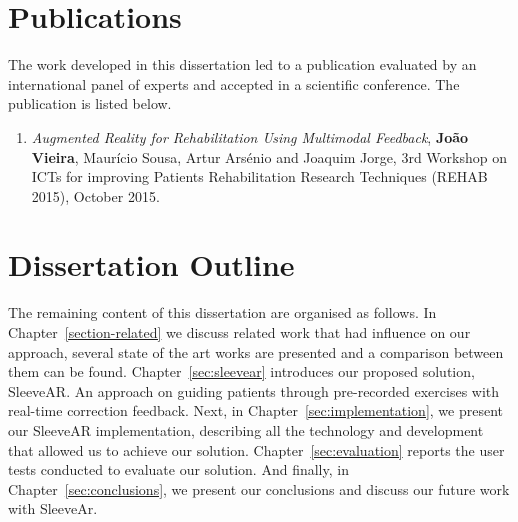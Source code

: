 \section{Publications}


The work developed in this dissertation led to a publication evaluated by an international panel of experts and accepted in a scientific conference. The publication is listed below.

\begin{enumerate}
\item \textit{Augmented Reality for Rehabilitation Using Multimodal Feedback}, \textbf{Jo\~{a}o Vieira}, Maur\'icio Sousa, Artur Ars\'enio and Joaquim Jorge, 3rd Workshop on ICTs for improving Patients Rehabilitation Research Techniques (REHAB 2015), October 2015.
\end{enumerate}


\section{Dissertation Outline}

The remaining content of this dissertation are organised as follows. 
In Chapter~\ref{section-related} we discuss related work that had influence on our approach, several state of the art works are presented and a comparison between them can be found. 
Chapter~\ref{sec:sleevear} introduces our proposed solution, SleeveAR. An approach on guiding patients through pre-recorded exercises with real-time correction feedback.
Next, in Chapter~\ref{sec:implementation}, we present our SleeveAR implementation, describing all the technology and development that allowed us to achieve our solution.
Chapter~\ref{sec:evaluation} reports the user tests conducted to evaluate our solution. 
And finally, in Chapter~\ref{sec:conclusions}, we present our conclusions and discuss our future work with SleeveAr.